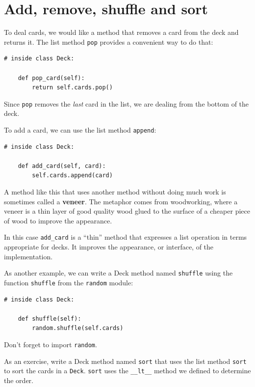 \documentclass[10pt]{book}
\begin{document}
\section{Add, remove, shuffle and sort}

To deal cards, we would like a method that
removes a card from the deck and returns it.
The list method {\tt pop} provides a convenient way to do that:

\begin{verbatim}
# inside class Deck:

    def pop_card(self):
        return self.cards.pop()
\end{verbatim}
%
Since {\tt pop} removes the {\em last} card in the list, we are
dealing from the bottom of the deck.

To add a card, we can use the list method {\tt append}:

\begin{verbatim}
# inside class Deck:

    def add_card(self, card):
        self.cards.append(card)
\end{verbatim}
%
A method like this that uses another method without doing
much work is sometimes called a {\bf veneer}.  The metaphor
comes from woodworking, where a veneer is a thin
layer of good quality wood glued to the surface of a cheaper piece of
wood to improve the appearance.

In this case \verb"add_card" is a ``thin'' method that expresses
a list operation in terms appropriate for decks.  It
improves the appearance, or interface, of the
implementation.

As another example, we can write a Deck method named {\tt shuffle}
using the function {\tt shuffle} from the {\tt random} module:

\begin{verbatim}
# inside class Deck:

    def shuffle(self):
        random.shuffle(self.cards)
\end{verbatim}
%
Don't forget to import {\tt random}.

As an exercise, write a Deck method named {\tt sort} that uses the
list method {\tt sort} to sort the cards in a {\tt Deck}.  {\tt sort}
uses the \verb"__lt__" method we defined to determine the order.
 
\end{document}
